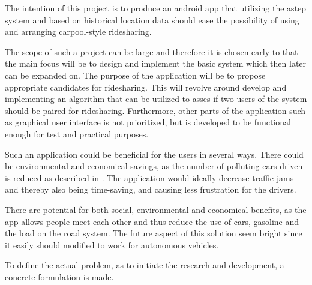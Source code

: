 The intention of this project is to produce an android app that utilizing the \gls{astep} system and based on historical location data should ease the possibility of using and arranging carpool-style ridesharing.

The scope of such a project can be large and therefore it is chosen early to that the main focus will be to design and implement the basic system which then later can be expanded on.
The purpose of the application will be to propose appropriate candidates for ridesharing.
This will revolve around develop and implementing an algorithm that can be utilized to asses if two users of the system should be paired for ridesharing.
Furthermore, other parts of the application such as graphical user interface is not prioritized, but is developed to be functional enough for test and practical purposes.

Such an application could be beneficial for the users in several ways.
There could be environmental and economical savings, as the number of polluting cars driven is reduced as described in \cite{doi:10.1080/01441647.2011.621557}. 
The application would ideally decrease traffic jams and thereby also being time-saving, and causing less frustration for the drivers.

There are potential for both social, environmental and economical benefits, as the app allows people meet each other and thus reduce the use of cars, gasoline and the load on the road system.
The future aspect of this solution seem bright since it easily should modified to work for autonomous vehicles.

To define the actual problem, as to initiate the research and development, a concrete formulation is made.